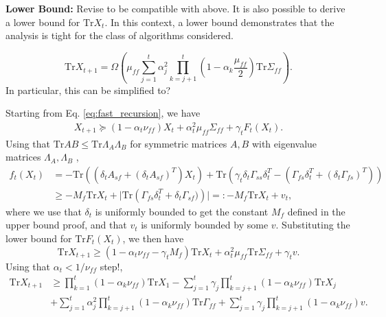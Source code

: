 
\textbf{Lower Bound:} {\color{red}Revise to be compatible with above.}
It is also possible to derive a lower bound for $\mathrm{Tr} X_t$.
In this context, a lower bound demonstrates that the analysis is tight for the class of algorithms considered.
\begin{lemma}\label{lem:fast_lb}
    \begin{equation}
        \mathrm{Tr} X_{t+1} = \Omega\left(\mu_{ff} \sum_{j=1}^t \alpha_j^2 \prod_{k=j+1}^t \left(1 - \alpha_k \frac{\mu_{ff}}{2}\right) \mathrm{Tr} \Sigma_{ff}\right) .
    \end{equation}    
    {\color{red}In particular, this can be simplified to?}
\end{lemma}

Starting from Eq. \eqref{eq:fast_recursion}, we have 
\begin{align*}
    X_{t+1} \succeq (1 - \alpha_t \nu_{ff}) X_t + \alpha_t^2 \mu_{ff} \Sigma_{ff} + \gamma_t F_t (X_t) .
\end{align*}
Using that $\mathrm{Tr} A B \leq \mathrm{Tr} \Lambda_A \Lambda_B$ for symmetric matrices $A, B$ with eigenvalue matrices $\Lambda_A, \Lambda_B$ \citep{Theobald_1975},
\begin{align*}
    f_t (X_t) 
    &= 
    -\mathrm{Tr}\left( (\delta_t A_{sf} + (\delta_t A_{sf})^T) X_t \right) + \mathrm{Tr} \left(\gamma_t \delta_t \Gamma_{ss} \delta_t^T - (\Gamma_{fs} \delta_t^T + (\delta_t \Gamma_{fs})^T)\right) 
    \\
    &\geq - M_{f} \mathrm{Tr} X_t
    + \lvert \mathrm{Tr}\left(\Gamma_{fs} \delta_t^T + \delta_t \Gamma_{sf} )\right) 
    \rvert
    =: -M_f \mathrm{Tr}X_t + v_t
    ,
\end{align*}
where we use that $\delta_t$ is uniformly bounded to get the constant $M_{f}$ defined in the upper bound proof, and that $v_t$ is uniformly bounded by some $v$.
Substituting the lower bound for $\mathrm{Tr} F_t (X_t)$, we then have
\begin{equation}
    \mathrm{Tr} X_{t+1} \geq (1 - \alpha_t \nu_{ff} - \gamma_t M_f) \mathrm{Tr} X_t + \alpha_t^2 \mu_{ff} \mathrm{Tr} \Sigma_{ff} + \gamma_t v .
\end{equation}
Using that $\alpha_t < 1/\nu_{ff}$ {\color{red}step!},
\begin{align*}
    \mathrm{Tr}X_{t+1} 
    &\geq \prod_{k=1}^t (1- \alpha_k \nu_{ff}) \mathrm{Tr} X_1 
    - \sum_{j=1}^t \gamma_j \prod_{k=j+1}^t \left(1 - \alpha_k \nu_{ff}\right) \mathrm{Tr} X_j \\
    &+ \sum_{j=1}^t \alpha_j^2 \prod_{k=j+1}^t (1 - \alpha_k \nu_{ff}) \mathrm{Tr} \Gamma_{ff} 
    + \sum_{j=1}^t \gamma_j \prod_{k=j+1}^t (1 - \alpha_k \nu_{ff}) v.    
\end{align*}
